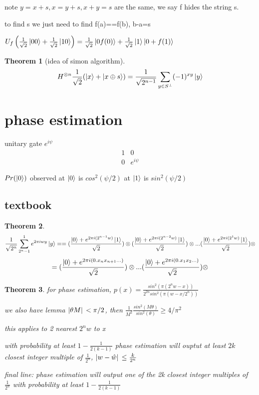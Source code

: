 \documentclass[10pt]{article}
\newcommand{\su}[2]{\sum_{#1}^{#2}}
\theoremstyle{break}
\newtheorem{thm}{Theorem}[subsection]
\begin{document}
         note $y=x+s, x=y+s, x+y=s$ are the same, we say f hides the string s.

         to find s we just need to find f(a)==f(b), b-a=s

         $U_f\left(\frac{1}{\sqrt{2}}\ket{00}+\frac{1}{\sqrt{2}}
         \ket{10}\right)=\frac{1}{\sqrt{2}}\ket{0 f(0)}+\frac{1}{\sqrt{2}}\ket{1 }\ket{0 +f(1)}$

         \begin{thm}[idea of simon algorithm]
             $$H^{\otimes n}\frac{1}{\sqrt{2}}(\ket{x}+\ket{x\oplus s})
             =\frac{1}{\sqrt{2^{n-1}}}\sum_{y\in S^{\perp}}
             (-1)^{xy}\ket{y}$$
         \end{thm}

    \section{phase estimation}
         unitary gate $e^{i\psi}$
         $$
         \begin{matrix}
             1 & 0\\
             0 & e^{i\psi}
         \end{matrix}$$
        
         $Pr(\ket{0})$ observed at $\ket{0}$ is $cos^2 (\psi/2)$
        at $\ket{1}$ is $sin^2 (\psi/2)$

        \subsection{textbook}
         \begin{thm}
             $$\frac{1}{\sqrt{2^n}}\su{2^n-1}{1}e^{2\pi i w y}\ket{y}==
             (\frac{\ket{0}+e^{2\pi i(2^{n-1}w)}\ket{1}}{\sqrt{2}})\otimes
             (\frac{\ket{0}+e^{2\pi i(2^{n-2}w)}\ket{1}}{\sqrt{2}})\otimes ...
             (\frac{\ket{0}+e^{2\pi i(2^{1}w)}\ket{1}}{\sqrt{2}})\otimes$$
             $$=(\frac{\ket{0}+e^{2\pi i(0.x_nx_{n+1}...) } } {\sqrt{2}})\otimes ...
             (\frac{\ket{0}+e^{2\pi i(0.x_1x_2...) } } {\sqrt{2}})\otimes$$
         \end{thm}

         \begin{thm}
             for phase estimation, $p(x)=\frac{sin^2(\pi(2^nw-x))}{2^{2n}sin^2(\pi (w-x/2^n))}$

             we also have lemma $\abs*{\theta M}<\pi /2$, then $\frac{1}{M^2}\frac{sin^2(M\theta)}{sin^2(\theta)}\geq 4/\pi^2$

             this applies to 2 nearest $2^nw$ to x

             with probability at least $1-\frac{1}{2(k-1)}$ phase estimation will ouptut at least 
             $2k $ closest integer multiple of $\frac{1}{2^n}$, $\abs*{w-\hat w}\leq \frac{k}{2^n}$ 

             final line: phase estimation will output one of the 2k closest integer multiples of $\frac{1}{2^n}$
             with probability at least $1-\frac{1}{2(k-1)}$
         \end{thm}
\end{document}
